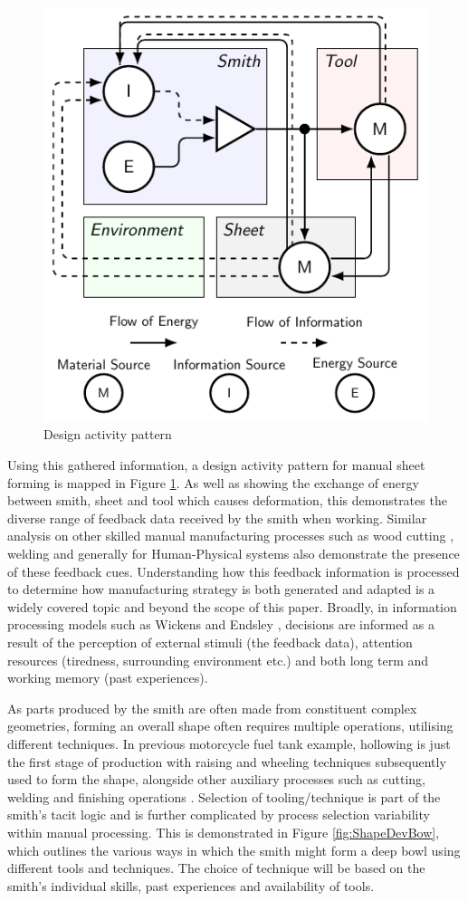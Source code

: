 \begin{figure}[h]
  \centering
  \includegraphics[width=0.5\linewidth]{Diagrams/DAP2.pdf}  
  \caption{Design activity pattern}
  \label{fig:DAP}
\end{figure}

Using this gathered information, a design activity pattern for manual sheet forming is mapped in Figure \ref{fig:DAP}. As well as showing the exchange of energy between smith, sheet and tool which causes deformation, this demonstrates the diverse range of feedback data received by the smith when working. Similar analysis on other skilled manual manufacturing processes such as wood cutting \citep{Roth1981FoundationDesign}, welding \citep{Zhang2012ModelingPrinciples} and generally for Human-Physical systems \cite{Zhou2018TowardManufacturing} also demonstrate the presence of these feedback cues. Understanding how this feedback information is processed to determine how manufacturing strategy is both generated and adapted is a widely covered topic and beyond the scope of this paper. Broadly, in information processing models such as Wickens \citep{Wickens2015EngineeringPerformance} and Endsley \citep{Endsley1995TowardSystems}, decisions are informed as a result of the perception of external stimuli (the feedback data), attention resources (tiredness, surrounding environment etc.) and both long term and working memory (past experiences). 

As parts produced by the smith are often made from constituent complex geometries, forming an overall shape often requires multiple operations, utilising different techniques. In previous motorcycle fuel tank example, hollowing is just the first stage of production with raising and wheeling techniques subsequently used to form the shape, alongside other auxiliary processes such as cutting, welding and finishing operations \citep{Barr2013ProfessionalFabrication}. Selection of tooling/technique is part of the smith's tacit logic and is further complicated by process selection variability within manual processing. This is demonstrated in Figure \ref{fig:ShapeDevBow}, which outlines the various ways in which the smith might form a deep bowl using different tools and techniques. The choice of technique will be based on the smith’s individual skills, past experiences and availability of tools. 

